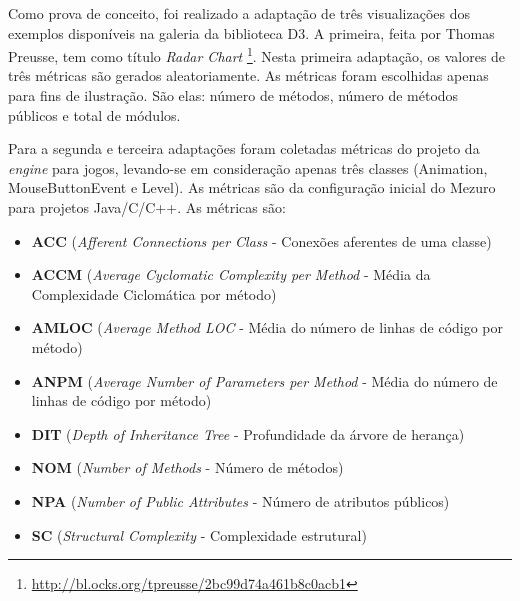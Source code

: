 Como prova de conceito, foi realizado a adaptação de três visualizações dos
exemplos disponíveis na galeria da biblioteca D3. A primeira, feita por Thomas
Preusse, tem como título \textit{Radar Chart}
\footnote{\url{http://bl.ocks.org/tpreusse/2bc99d74a461b8c0acb1}}. Nesta
primeira adaptação, os valores de três métricas são gerados aleatoriamente. As
métricas foram escolhidas apenas para fins de ilustração. São elas: número de
métodos, número de métodos públicos e total de módulos.

Para a segunda e terceira adaptações foram coletadas métricas do projeto da
\textit{engine} para jogos, levando-se
em consideração apenas três classes (Animation, MouseButtonEvent e Level). As
métricas são da configuração inicial do Mezuro para projetos Java/C/C++. As
métricas são:

\begin{itemize}
  \item \textbf{ACC} (\textit{Afferent Connections per Class} - Conexões
	aferentes de uma classe)
  \item \textbf{ACCM} (\textit{Average Cyclomatic Complexity per Method} -
	Média da Complexidade Ciclomática por método)
  \item \textbf{AMLOC} (\textit{Average Method LOC} - Média do número de linhas
	de código por método)
  \item \textbf{ANPM} (\textit{Average Number of Parameters per Method} - Média
	do número de linhas de código por método)
  \item \textbf{DIT} (\textit{Depth of Inheritance Tree} - Profundidade da
	árvore de herança)
  \item \textbf{NOM} (\textit{Number of Methods} - Número de métodos)
  \item \textbf{NPA} (\textit{Number of Public Attributes} - Número de
	atributos públicos)
  \item \textbf{SC} (\textit{Structural Complexity} - Complexidade estrutural)
\end{itemize}



